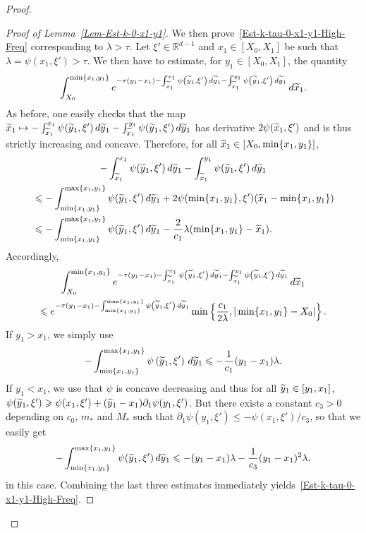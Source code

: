 \documentclass[AHL,Unicode,longabstracts]{cedram}
\newcommand*\R{\mathbb{R}}
\renewcommand{\leq}{\leqslant}
\renewcommand{\geq}{\geqslant}
\renewcommand{\tilde}{\widetilde}
\let\oldtilde\tilde
\renewcommand*{\tilde}[1]{\mathchoice{\widetilde{#1}}{\widetilde{#1}}{\oldtilde{#1}}{\oldtilde{#1}}}
\begin{document}
\begin{proof}
\begin{proof}[Proof of Lemma~\ref{Lem-Est-k-0-x1-y1}]
We then prove~\eqref{Est-k-tau-0-x1-y1-High-Freq} corresponding to $\lambda > \tau$. Let $\xi' \in \R^{d-1}$ and $x_1 \in [X_0,X_1]$ be such that $\lambda = \psi(x_1, \xi') > \tau$. We then have to estimate, for $y_1 \in [X_0,X_1]$, the quantity
\[
\int_{X_0}^{\min \{ x_1, y_1\}} e^{-\tau(y_1-x_1)-\int_{\tilde{x}_1}^{x_1} \psi\left(\tilde{y}_1,\xi'\right) \, d\tilde{y}_1 - \int_{{\tilde{x}_1}}^{y_1} \psi\left(\tilde{y}_1,\xi'\right) \,d \tilde{y}_1 } \, d \tilde{x}_1.
\]
As before, one easily checks that the map $\tilde x_1 \mapsto -\int_{\tilde{x}_1}^{x_1} \psi(\tilde{y}_1,\xi') \, d\tilde{y}_1 - \int_{{\tilde{x}_1}}^{y_1} \psi(\tilde{y}_1,\xi') \,d \tilde{y}_1$ has derivative $2 \psi(\tilde x_1, \xi')$ and is thus strictly increasing and concave. Therefore, for all $\tilde x_1 \in [X_0, \min\{x_1,y_1\}]$,
\begin{multline*}
-\int_{\tilde{x}_1}^{x_1} \psi(\tilde{y}_1,\xi') \, d\tilde{y}_1 - \int_{{\tilde{x}_1}}^{y_1} \psi(\tilde{y}_1,\xi') \,d \tilde{y}_1
\\
\begin{aligned}
& \leq - \int_{\min\{x_1,y_1\}}^{\max\{x_1,y_1\}} \psi(\tilde{y}_1,\xi') \, d\tilde{y}_1 + 2 \psi(\min\{x_1, y_1\}, \xi') (\tilde x_1 - \min\{x_1, y_1\})
\\
& \leq - \int_{\min\{x_1,y_1\}}^{\max\{x_1,y_1\}} \psi(\tilde{y}_1,\xi') \, d\tilde{y}_1 - \frac{2}{c_1} \lambda (\min\{x_1, y_1\} - \tilde x_1).
\end{aligned}
\end{multline*}
Accordingly,
\begin{multline*}
\int_{X_0}^{\min \{ x_1, y_1\}} e^{-\tau(y_1-x_1)-\int_{\tilde{x}_1}^{x_1} \psi\left(\tilde{y}_1,\xi'\right) \, d\tilde{y}_1 - \int_{{\tilde{x}_1}}^{y_1} \psi\left(\tilde{y}_1,\xi'\right) \,d \tilde{y}_1 } \, d \tilde{x}_1
\\
\leq e^{-\tau (y_1 - x_1) - \int_{\min\{x_1,y_1\}}^{\max\{x_1,y_1\}} \psi\left(\tilde{y}_1,\xi'\right) \, d\tilde{y}_1 } \min\left\{ \frac{c_1}{2 \lambda}, |\min\{x_1, y_1\} - X_0| \right\}.
\end{multline*}
If $y_1 > x_1$, we simply use
\[
- \int_{\min\{x_1,y_1\}}^{\max\{x_1,y_1\}} \psi\left(\tilde{y}_1,\xi'\right) \, d\tilde{y}_1
\leq - \frac{1}{c_1} (y_1- x_1) \lambda.
\]
If $y_1 < x_1$, we use that $\psi$ is concave decreasing and thus for all $\tilde y_1 \in [y_1, x_1]$, $\psi(\tilde y_1, \xi') \geq \psi(x_1, \xi') + (\tilde y_1 - x_1) \partial_1 \psi(y_1, \xi')$. But there exists a constant $c_3>0$ depending on $c_0$, $m_*$ and $M_*$ such that $\partial_1 \psi(y_1, \xi') \leq - \psi(x_1, \xi')/c_3$, so that we easily get
\[
- \int_{\min\{x_1,y_1\}}^{\max\{x_1,y_1\}} \psi(\tilde{y}_1,\xi') \, d\tilde{y}_1
\leq - (y_1- x_1) \lambda - \frac{1}{c_3} (y_1- x_1)^2 \lambda.
\]
in this case. Combining the last three estimates immediately yields~\eqref{Est-k-tau-0-x1-y1-High-Freq}.


\end{proof}
\end{proof}
\end{document}
